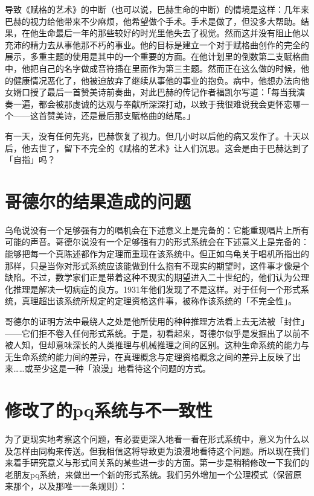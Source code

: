 \documentclass[
  12pt,
  twoside,
  openright,
  oldfontcommands,
]{memoir}
\begin{document}
导致《赋格的艺术》的中断（也可以说，巴赫生命的中断）的情境是这样：几年来巴赫的视力给他带来不少麻烦，他希望做个手术。手术是做了，但没多大帮助。结果，在他生命最后一年的那些较好的时光里他失去了视觉。然而这并没有阻止他以充沛的精力去从事他那不朽的事业。他的目标是建立一个对于赋格曲创作的完全的展示，多重主题的使用是其中的一个重要的方面。在他计划里的倒数第二支赋格曲中，他把自己的名字做成音符插在里面作为第三主题。然而正在这么做的时候，他的健康情况恶化了，他被迫放弃了继续从事他的事业的抱负。病中，他想办法向他女婿口授了最后一首赞美诗前奏曲，对此巴赫的传记作者福凯尔写道：「每当我演奏一遍，都会被那虔诚的达观与奉献所深深打动，以致于我很难说我会更怀恋哪一个------这首赞美诗，还是最后那支赋格曲的结尾。」

有一天，没有任何先兆，巴赫恢复了视力。但几小时以后他的病又发作了。十天以后，他去世了，留下不完全的《赋格的艺术》让人们沉思。这会是由于巴赫达到了「自指」吗？

\section{哥德尔的结果造成的问题}

乌龟说没有一个足够强有力的唱机会在下述意义上是完备的：它能重现唱片上所有可能的声音。哥德尔说没有一个足够强有力的形式系统会在下述意义上是完备的：能够把每一个真陈述都作为定理而重现在该系统中。但正如乌龟关于唱机所指出的那样，只是当你对形式系统应该能做到什么抱有不现实的期望时，这件事才像是个缺陷。不过，数学家们正是带着这种不现实的期望进入二十世纪的，他们认为公理化推理是解决一切病症的良方。1931年他们发现了不是这样。对于任何一个形式系统，真理超出该系统所规定的定理资格这件事，被称作该系统的「不完全性」。

哥德尔的证明方法中最绕人之处是他所使用的种种推理方法看上去无法被「封住」------它们拒不卷入任何形式系统。于是，初看起来，哥德尔似乎是发掘出了以前不被人知，但却意味深长的人类推理与机械推理之间的区别。这种生命系统的能力与无生命系统的能力间的差异，在真理概念与定理资格概念之间的差异上反映了出来\ldots\ldots 或至少这是一种「浪漫」地看待这个问题的方式。

\section{修改了的pq系统与不一致性}

为了更现实地考察这个问题，有必要更深入地看一看在形式系统中，意义为什么以及怎样由同构来传送。但我相信这将导致更为浪漫地看待这个问题。所以现在我们来着手研究意义与形式间关系的某些进一步的方面。第一步是稍稍修改一下我们的老朋友pq系统，来做出一个新的形式系统。我们另外增加一个公理模式（保留原来那个，以及那唯一一条规则）：
\end{document}
